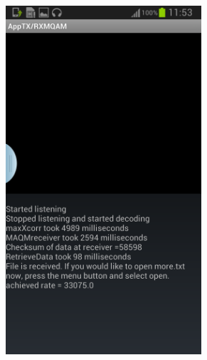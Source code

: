 \documentclass[12pt,a4paper,openright]{report}
\begin{document}
\begin{figure}[H]
 \centering
 \begin{subfigure}{.5\textwidth}
 \centering
    \includegraphics[width=0.8\textwidth]{20140508Receivermoreexample.png}
    \label{fig:20140508Receivermoreexample}
    \end{subfigure}%
 \begin{subfigure}{.5\textwidth}
  	 \centering

\end{subfigure}
\end{figure}
\end{document}
